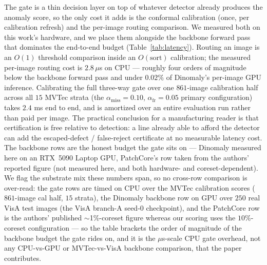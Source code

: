 \documentclass[11pt]{article}
\begin{document}
The gate is a thin decision layer on top of whatever detector already produces the anomaly score,
so the only cost it adds is the conformal calibration (once, per calibration refresh) and the
per-image routing comparison. We measured both on this work's hardware, and we place them
alongside the backbone forward pass that dominates the end-to-end budget
(Table~\ref{tab:latency}). Routing an image is an $O(1)$ threshold comparison inside an
$O(\text{sort})$ calibration; the measured per-image routing cost is $2.8\,\mu$s on CPU ---
roughly four orders of magnitude below the backbone forward pass and under $0.02\%$ of Dinomaly's
per-image GPU inference. Calibrating the full three-way gate over one $861$-image calibration half
across all $15$ MVTec strata (the $\alpha_{\text{miss}}=0.10$, $\alpha_{\text{fr}}=0.05$ primary
configuration) takes $2.4$ ms end to end, and is amortized over an entire evaluation run rather
than paid per image. The practical conclusion for a manufacturing reader is that certification is
free relative to detection: a line already able to afford the detector can add the escaped-defect /
false-reject certificate at no measurable latency cost. The backbone rows are the honest budget the
gate sits on --- Dinomaly measured here on an RTX~5090 Laptop GPU, PatchCore's row taken from the
authors' reported figure (not measured here, and both hardware- and coreset-dependent). We flag the
substrate mix these numbers span, so no cross-row comparison is over-read: the gate rows are timed
on CPU over the MVTec calibration scores ($861$-image cal half, $15$ strata), the Dinomaly backbone
row on GPU over $250$ real VisA test images (the VisA branch-A seed-$0$ checkpoint), and the
PatchCore row is the authors' published $\sim$1\%-coreset figure whereas our scoring uses the
$10\%$-coreset configuration --- so the table brackets the order of magnitude of the
backbone budget the gate rides on, and it is the $\mu$s-scale CPU gate overhead, not any
CPU-vs-GPU or MVTec-vs-VisA backbone comparison, that the paper contributes.
\end{document}
